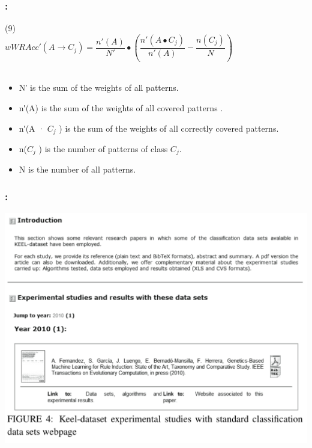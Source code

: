 \documentclass{beamer}
\begin{document}
\begin{CJK*}{UTF8}{bsmi}

\begin{frame}
	\frametitle{\insertsection : \insertsubsection}
	
	\begin{block}{ (9)}
		~\\
		\centering\textbf{$wWRAcc'  (A\longrightarrow C_{j})=\dfrac{n'(A)}{N'}\bullet(\dfrac{n'(A\bullet C_{j})}{n'(A)}-\dfrac{n(C_{j})}{N})$}\\
		~\\
	\end{block}
		\begin{itemize}
			\item N′ is the sum of the weights of all patterns.
			\item n′(A) is the sum of the weights of all covered patterns .
			\item n′(A · $C_{j}$ ) is the sum of the weights of all correctly covered patterns.
			\item n($C_{j}$ ) is the number of patterns of class $C_{j}$.  
			\item N is the number of all patterns. 
			
		\end{itemize}
	
\end{frame}


\begin{frame}
	\frametitle{\insertsection : \insertsubsection}
\begin{center}
\includegraphics[height=.6\textheight]{./3.png}
\end{center}
\end{frame}


\end{CJK*}
\end{document}
